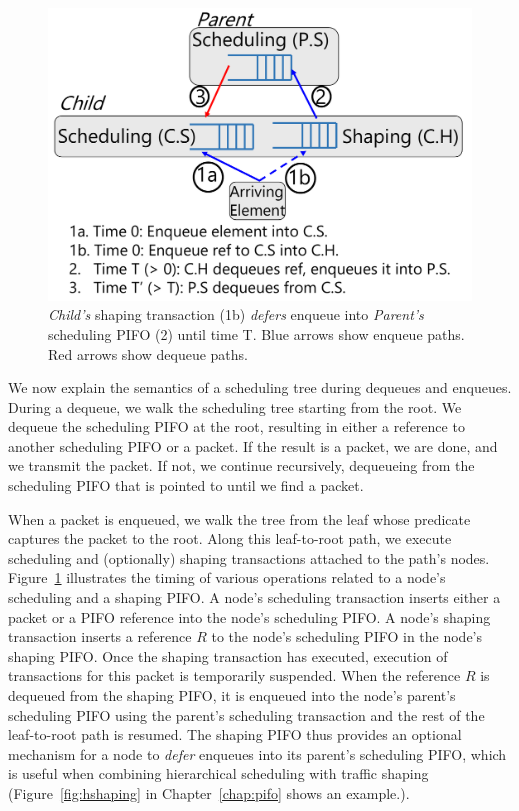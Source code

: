 \begin{figure}[!t]
  \centering
  \includegraphics[width=0.6\columnwidth]{pifo_shaping_semantics.pdf}
  \caption{\textit{Child's} shaping transaction (1b) {\em defers} enqueue
  into \textit{Parent's} scheduling PIFO (2) until time T.  Blue arrows
  show enqueue paths. Red arrows show dequeue paths.  }
  \label{fig:shaping_timing}
\end{figure}

We now explain the semantics of a scheduling tree during dequeues and enqueues.
During a dequeue, we walk the scheduling tree starting from the root. We
dequeue the scheduling PIFO at the root, resulting in either a reference to
another scheduling PIFO or a packet. If the result is a packet, we are done,
and we transmit the packet. If not, we continue recursively, dequeueing from
the scheduling PIFO that is pointed to until we find a packet.

When a packet is enqueued, we walk the tree from the leaf whose predicate
captures the packet to the root. Along this leaf-to-root path, we execute
scheduling and (optionally) shaping transactions attached to the path's nodes.
Figure~\ref{fig:shaping_timing} illustrates the timing of various operations
related to a node's scheduling and a shaping PIFO. A node's scheduling
transaction inserts either a packet or a PIFO reference into the node's
scheduling PIFO. A node's shaping transaction inserts a reference $R$ to the
node's scheduling PIFO in the node's shaping PIFO. Once the shaping transaction
has executed, execution of transactions for this packet is temporarily
suspended.  When the reference $R$ is dequeued from the shaping PIFO, it is
enqueued into the node's parent's scheduling PIFO using the parent's scheduling
transaction and the rest of the leaf-to-root path is resumed.  The shaping PIFO
thus provides an optional mechanism for a node to {\em defer} enqueues into its
parent's scheduling PIFO, which is useful when combining hierarchical
scheduling with traffic shaping (Figure~\ref{fig:hshaping} in
Chapter~\ref{chap:pifo} shows an example.).

